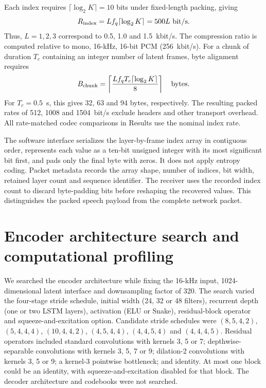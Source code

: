Each index requires $\lceil\log_2K\rceil=10$ bits under fixed-length packing, giving
\begin{equation}
 R_{\rm index}=Lf_q\lceil\log_2K\rceil=500L\ {\rm bit/s}.
\end{equation}
Thus, $L=1,2,3$ correspond to 0.5, 1.0 and 1.5~kbit/s. The compression ratio is computed relative to mono, 16-kHz, 16-bit PCM (256~kbit/s). For a chunk of duration $T_c$ containing an integer number of latent frames, byte alignment requires
\begin{equation}
 B_{\rm chunk}=\left\lceil
 \frac{Lf_qT_c\lceil\log_2K\rceil}{8}
 \right\rceil\quad\text{bytes}.
\end{equation}
For $T_c=0.5$~s, this gives 32, 63 and 94 bytes, respectively. The resulting packed rates of 512, 1008 and 1504~bit/s exclude headers and other transport overhead. All rate-matched codec comparisons in Results use the nominal index rate.

The software interface serializes the layer-by-frame index array in contiguous order, represents each value as a ten-bit unsigned integer with its most significant bit first, and pads only the final byte with zeros. It does not apply entropy coding. Packet metadata records the array shape, number of indices, bit width, retained layer count and sequence identifier. The receiver uses the recorded index count to discard byte-padding bits before reshaping the recovered values. This distinguishes the packed speech payload from the complete network packet.

\section{Encoder architecture search and computational profiling}
We searched the encoder architecture while fixing the 16-kHz input, 1024-dimensional latent interface and downsampling factor of 320. The search varied the four-stage stride schedule, initial width (24, 32 or 48 filters), recurrent depth (one or two LSTM layers), activation (ELU or Snake), residual-block operator and squeeze-and-excitation option. Candidate stride schedules were $(8,5,4,2)$, $(5,4,4,4)$, $(10,4,4,2)$, $(4,5,4,4)$, $(4,4,5,4)$ and $(4,4,4,5)$. Residual operators included standard convolutions with kernels 3, 5 or 7; depthwise-separable convolutions with kernels 3, 5, 7 or 9; dilation-2 convolutions with kernels 3, 5 or 9; a kernel-3 pointwise bottleneck; and identity. At most one block could be an identity, with squeeze-and-excitation disabled for that block. The decoder architecture and codebooks were not searched.

